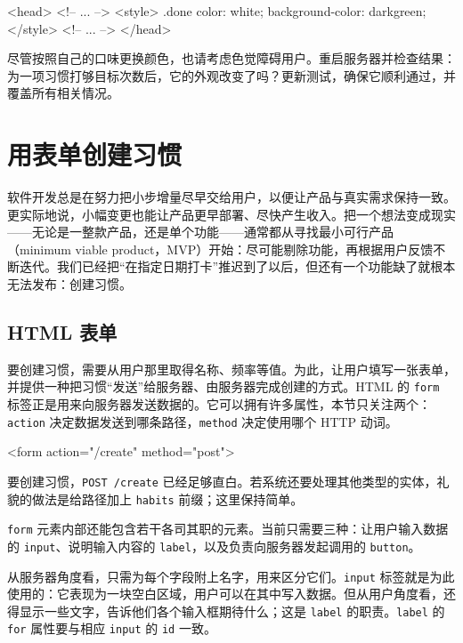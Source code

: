 \begin{htmlcode}[]
<head>
<!-- ... -->
<style>
  .done {
    color: white;
    background-color: darkgreen;
  }
</style>
<!-- ... -->
</head>
\end{htmlcode}

尽管按照自己的口味更换颜色，也请考虑色觉障碍用户。重启服务器并检查结果：为一项习惯打够目标次数后，它的外观改变了吗？更新测试，确保它顺利通过，并覆盖所有相关情况。

\section{用表单创建习惯}

软件开发总是在努力把小步增量尽早交给用户，以便让产品与真实需求保持一致。更实际地说，小幅变更也能让产品更早部署、尽快产生收入。把一个想法变成现实——无论是一整款产品，还是单个功能——通常都从寻找最小可行产品（minimum viable product，MVP）开始：尽可能剔除功能，再根据用户反馈不断迭代。我们已经把“在指定日期打卡”推迟到了以后，但还有一个功能缺了就根本无法发布：创建习惯。

\subsection{HTML 表单}

要创建习惯，需要从用户那里取得名称、频率等值。为此，让用户填写一张表单，并提供一种把习惯“发送”给服务器、由服务器完成创建的方式。HTML 的 \texttt{form} 标签正是用来向服务器发送数据的。它可以拥有许多属性，本节只关注两个：\texttt{action} 决定数据发送到哪条路径，\texttt{method} 决定使用哪个 HTTP 动词。

\begin{htmlcode}[]
<form action="/create" method="post">
\end{htmlcode}

要创建习惯，\texttt{POST /create} 已经足够直白。若系统还要处理其他类型的实体，礼貌的做法是给路径加上 \texttt{habits} 前缀；这里保持简单。

\texttt{form} 元素内部还能包含若干各司其职的元素。当前只需要三种：让用户输入数据的 \texttt{input}、说明输入内容的 \texttt{label}，以及负责向服务器发起调用的 \texttt{button}。

从服务器角度看，只需为每个字段附上名字，用来区分它们。\texttt{input} 标签就是为此使用的：它表现为一块空白区域，用户可以在其中写入数据。但从用户角度看，还得显示一些文字，告诉他们各个输入框期待什么；这是 \texttt{label} 的职责。\texttt{label} 的 \texttt{for} 属性要与相应 \texttt{input} 的 \texttt{id} 一致。

